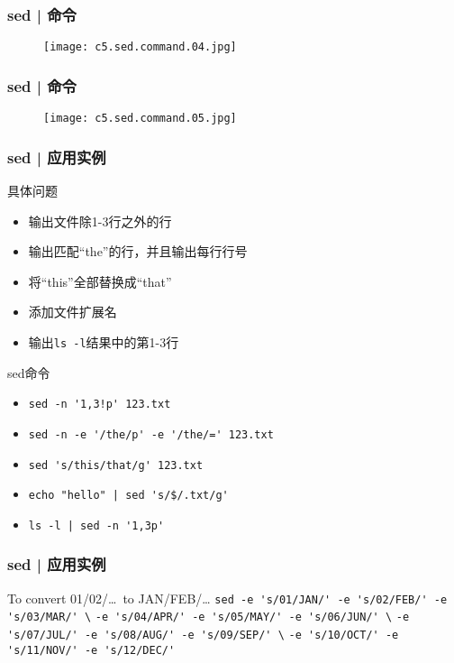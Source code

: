 \begin{frame}
  \frametitle{sed | 命令}
  \begin{figure}
    \centering
    \texttt{[image: c5.sed.command.04.jpg]}
  \end{figure}
\end{frame}

\begin{frame}
  \frametitle{sed | 命令}
  \begin{figure}
    \centering
    \texttt{[image: c5.sed.command.05.jpg]}
  \end{figure}
\end{frame}

\begin{frame}[fragile]
  \frametitle{sed | \alert{应用实例}}
  \begin{block}{具体问题}
    \begin{itemize}
      \item<2-> 输出文件除1-3行之外的行 
      \item<4-> 输出匹配“the”的行，并且输出每行行号
      \item<6-> 将“this”全部替换成“that”
      \item<8-> 添加文件扩展名
      \item<10-> 输出\verb|ls -l|结果中的第1-3行
    \end{itemize}
  \end{block}
  \begin{block}{sed命令}
    \begin{itemize}
      \item<3-> \verb|sed -n '1,3!p' 123.txt|
      \item<5-> \verb|sed -n -e '/the/p' -e '/the/=' 123.txt|
      \item<7-> \verb|sed 's/this/that/g' 123.txt|
      \item<9-> \verb=echo "hello" | sed 's/$/.txt/g'=
      \item<11-> \verb=ls -l | sed -n '1,3p'=
    \end{itemize}
  \end{block}
\end{frame}

\begin{frame}[fragile]
  \frametitle{sed | 应用实例}
  \begin{block}{To convert 01/02/\ldots \ to JAN/FEB/\ldots}
    \verb|sed -e 's/01/JAN/' -e 's/02/FEB/' -e 's/03/MAR/' \|
    \verb|-e 's/04/APR/' -e 's/05/MAY/' -e 's/06/JUN/' \|
    \verb|-e 's/07/JUL/' -e 's/08/AUG/' -e 's/09/SEP/' \|
    \verb|-e 's/10/OCT/' -e 's/11/NOV/' -e 's/12/DEC/'|
  \end{block}
\end{frame}

